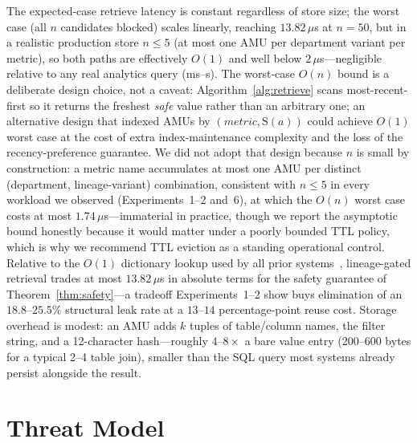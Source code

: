 \documentclass[nolineno]{ieeeaccess}
\begin{document}
The expected-case retrieve latency is constant regardless of store size;
the worst case (all $n$ candidates blocked) scales linearly, reaching
$13.82\,\mu$s at $n{=}50$, but in a realistic production store $n \leq 5$
(at most one AMU per department variant per metric), so both paths are
effectively $O(1)$ and well below $2\,\mu$s---negligible relative to any
real analytics query (ms--s).
The worst-case $O(n)$ bound is a deliberate design choice, not a caveat:
Algorithm~\ref{alg:retrieve} scans most-recent-first so it returns the
freshest \emph{safe} value rather than an arbitrary one; an alternative
design that indexed AMUs by $(\mathit{metric}, \mathrm{S}(a))$ could achieve
$O(1)$ worst case at the cost of extra index-maintenance complexity and the
loss of the recency-preference guarantee.
We did not adopt that design because $n$ is small by construction: a metric
name accumulates at most one AMU per distinct (department, lineage-variant)
combination, consistent with $n \leq 5$ in every workload we observed
(Experiments~1--2 and~6), at which the $O(n)$ worst case costs at most
$1.74\,\mu$s---immaterial in practice, though we report the asymptotic bound
honestly because it would matter under a poorly bounded TTL policy, which is
why we recommend TTL eviction as a standing operational control.
Relative to the $O(1)$ dictionary lookup used by all prior
systems~\cite{packer2023memgpt,rasmussen2025zep,xu2025amem,taheri2026governed,lam2026ssgm,oracle2026memory},
lineage-gated retrieval trades at most $13.82\,\mu$s in absolute terms for
the safety guarantee of Theorem~\ref{thm:safety}---a tradeoff Experiments~1--2
show buys elimination of an $18.8$--$25.5\%$ structural leak rate at a
$13$--$14$ percentage-point reuse cost.
Storage overhead is modest: an AMU adds $k$ tuples of table/column names,
the filter string, and a 12-character hash---roughly $4$--$8\times$ a bare
value entry (200--600 bytes for a typical 2--4 table join), smaller than the
SQL query most systems already persist alongside the result.

\section{Threat Model}
\label{sec:threat}
\end{document}
